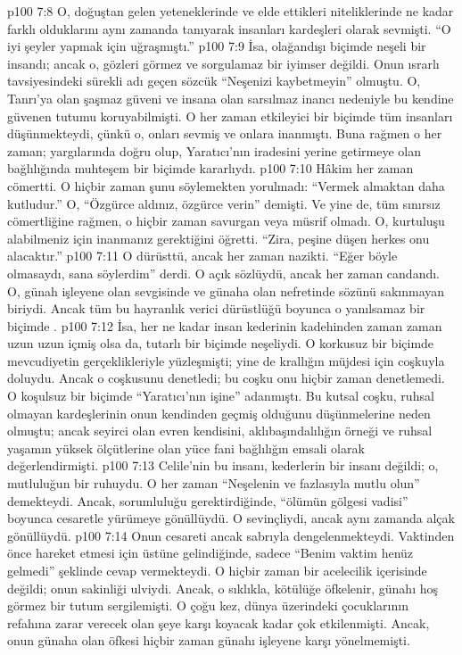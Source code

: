 \vs p100 7:8 O, doğuştan gelen yeteneklerinde ve elde ettikleri niteliklerinde ne kadar farklı olduklarını aynı zamanda tanıyarak insanları kardeşleri olarak sevmişti. “O iyi şeyler yapmak için uğraşmıştı.”
\vs p100 7:9 İsa, olağandışı biçimde neşeli bir insandı; ancak o, gözleri görmez ve sorgulamaz bir iyimser değildi. Onun ısrarlı tavsiyesindeki sürekli adı geçen sözcük “Neşenizi kaybetmeyin” olmuştu. O, Tanrı’ya olan şaşmaz güveni ve insana olan sarsılmaz inancı nedeniyle bu kendine güvenen tutumu koruyabilmişti. O her zaman etkileyici bir biçimde tüm insanları düşünmekteydi, çünkü o, onları sevmiş ve onlara inanmıştı. Buna rağmen o her zaman; yargılarında doğru olup, Yaratıcı’nın iradesini yerine getirmeye olan bağlılığında muhteşem bir biçimde kararlıydı.
\vs p100 7:10 Hâkim her zaman cömertti. O hiçbir zaman şunu söylemekten yorulmadı: “Vermek almaktan daha kutludur.” O, “Özgürce aldınız, özgürce verin” demişti. Ve yine de, tüm sınırsız cömertliğine rağmen, o hiçbir zaman savurgan veya müsrif olmadı. O, kurtuluşu alabilmeniz için inanmanız gerektiğini öğretti. “Zira, peşine düşen herkes onu alacaktır.”
\vs p100 7:11 O dürüsttü, ancak her zaman nazikti. “Eğer böyle olmasaydı, sana söylerdim” derdi. O açık sözlüydü, ancak her zaman candandı. O, günah işleyene olan sevgisinde ve günaha olan nefretinde sözünü sakınmayan biriydi. Ancak tüm bu hayranlık verici dürüstlüğü boyunca o yanılsamaz bir biçimde .
\vs p100 7:12 İsa, her ne kadar insan kederinin kadehinden zaman zaman uzun uzun içmiş olsa da, tutarlı bir biçimde neşeliydi. O korkusuz bir biçimde mevcudiyetin gerçeklikleriyle yüzleşmişti; yine de krallığın müjdesi için coşkuyla doluydu. Ancak o coşkusunu denetledi; bu coşku onu hiçbir zaman denetlemedi. O koşulsuz bir biçimde “Yaratıcı’nın işine” adanmıştı. Bu kutsal coşku, ruhsal olmayan kardeşlerinin onun kendinden geçmiş olduğunu düşünmelerine neden olmuştu; ancak seyirci olan evren kendisini, aklıbaşındalılığın örneği ve ruhsal yaşamın yüksek ölçütlerine olan yüce fani bağlılığın emsali olarak değerlendirmişti.
\vs p100 7:13 Celile’nin bu insanı, kederlerin bir insanı değildi; o, mutluluğun bir ruhuydu. O her zaman “Neşelenin ve fazlasıyla mutlu olun” demekteydi. Ancak, sorumluluğu gerektirdiğinde, “ölümün gölgesi vadisi” boyunca cesaretle yürümeye gönüllüydü. O sevinçliydi, ancak aynı zamanda alçak gönüllüydü.
\vs p100 7:14 Onun cesareti ancak sabrıyla dengelenmekteydi. Vaktinden önce hareket etmesi için üstüne gelindiğinde, sadece “Benim vaktim henüz gelmedi” şeklinde cevap vermekteydi. O hiçbir zaman bir acelecilik içerisinde değildi; onun sakinliği ulviydi. Ancak, o sıklıkla, kötülüğe öfkelenir, günahı hoş görmez bir tutum sergilemişti. O çoğu kez, dünya üzerindeki çocuklarının refahına zarar verecek olan şeye karşı koyacak kadar çok etkilenmişti. Ancak, onun günaha olan öfkesi hiçbir zaman günahı işleyene karşı yönelmemişti.
